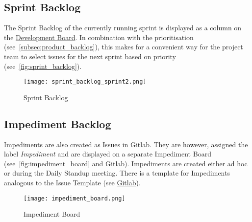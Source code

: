 \subsection{Sprint Backlog}\label{subsec:sprint-backlog}
The Sprint Backlog of the currently running sprint is displayed as a column on the \href{https://gitlab.ti.bfh.ch/decibel-threshold-event-displayer/decibel-threshold-event-displayer/-/boards/2832}{Development Board}.
In combination with the prioritisation (see\ \ref{subsec:product_backlog}), this makes for a convenient way for the project team to select issues for the next sprint based on priority (see\ \autoref{fig:sprint_backlog}).
\begin{figure}[H]
    \centering
    \texttt{[image: sprint\_backlog\_sprint2.png]}
    \caption{Sprint Backlog}\label{fig:sprint_backlog}
\end{figure}
\subsection{Impediment Backlog}\label{subsec:impediment_board}
Impediments are also created as Issues in Gitlab.
They are however, assigned the label \textit{Impediment} and are displayed on a separate Impediment Board (see\ \autoref{fig:impediment_board} and \href{https://gitlab.ti.bfh.ch/decibel-threshold-event-displayer/decibel-threshold-event-displayer/-/boards/2834?label_name[]=impediment}{Gitlab}).
Impediments are created either ad hoc or during the Daily Standup meeting.
There is a template for Impediments analogous to the Issue Template (see \href{https://gitlab.ti.bfh.ch/decibel-threshold-event-displayer/decibel-threshold-event-displayer/-/blob/main/.gitlab/issue_templates/Impediment.md}{Gitlab}).
\begin{figure}[H]
    \centering
    \texttt{[image: impediment\_board.png]}
    \caption{Impediment Board}\label{fig:impediment_board}
\end{figure}